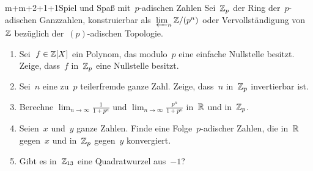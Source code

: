\documentclass{uebblatt}
\begin{document}

\begin{aufgabe}{m+m+2+1+1}{Spiel und Spaß mit~$p$-adischen Zahlen}
Sei~$\mathbb{Z}_p$ der Ring der~$p$-adischen Ganzzahlen, konstruierbar
als~$\varprojlim_n \mathbb{Z}/(p^n)$ oder Vervollständigung von~$\mathbb{Z}$ bezüglich
der~$(p)$-adischen Topologie.
\begin{enumerate}
\item Sei~$f \in \mathbb{Z}[X]$ ein Polynom, das modulo~$p$ eine einfache Nullstelle
besitzt. Zeige, dass~$f$ in~$\mathbb{Z}_p$ eine Nullstelle besitzt.
\item Sei~$n$ eine zu~$p$ teilerfremde ganze Zahl. Zeige, dass~$n$ in~$\mathbb{Z}_p$
invertierbar ist.
\item Berechne $\lim_{n \to \infty} \frac{1}{1 + p^n}$ und $\lim_{n \to \infty}
\frac{p^n}{1 + p^n}$ in~$\mathbb{R}$ und in~$\mathbb{Z}_p$.
\item Seien~$x$ und~$y$ ganze Zahlen. Finde eine Folge~$p$-adischer Zahlen, die
in~$\mathbb{R}$ gegen~$x$ und in~$\mathbb{Z}_p$ gegen~$y$ konvergiert.
\item Gibt es in~$\mathbb{Z}_{13}$ eine Quadratwurzel aus~$-1$?
\end{enumerate}
\end{aufgabe}
\end{document}
